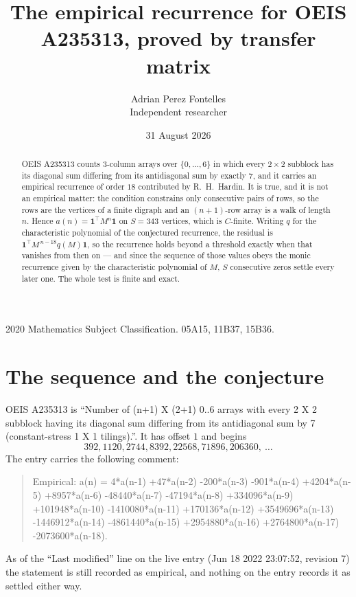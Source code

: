 \documentclass[11pt,a4paper]{article}
\title{The empirical recurrence for OEIS A235313, proved by transfer matrix}
\author{Adrian Perez Fontelles\\ \small Independent researcher}
\date{31 August 2026}
\theoremstyle{plain}
\theoremstyle{definition}
\begin{document}
\maketitle

\begin{abstract}
OEIS A235313 counts $3$-column arrays over $\{0,\dots,6\}$ in which every
$2\times2$ subblock has its diagonal sum differing from its antidiagonal sum by
exactly $7$, and it
carries an empirical recurrence of order $18$ contributed by R.~H.~Hardin. It is true,
and it is not an empirical matter: the condition constrains only consecutive pairs of rows,
so the rows are the vertices of a finite digraph and an $(n+1)$-row array is a walk of
length $n$. Hence $a(n)=\mathbf{1}^{\!\top}M^{n}\mathbf{1}$ on $S=343$ vertices, which
is $C$-finite. Writing $q$ for the characteristic polynomial of the conjectured recurrence,
the residual is $\mathbf{1}^{\!\top}M^{\,n-18}q(M)\mathbf{1}$, so the recurrence
holds beyond a threshold exactly when that vanishes from then on --- and since the sequence
of those values obeys the monic recurrence given by the characteristic polynomial of $M$,
$S$ consecutive zeros settle every later one. The whole test is finite and exact.
\end{abstract}

\noindent\small 2020 Mathematics Subject Classification. 05A15, 11B37, 15B36.\normalsize

\section{The sequence and the conjecture}

OEIS A235313 is ``Number of (n+1) X (2+1) 0..6 arrays with every 2 X 2 subblock having its diagonal sum differing from its antidiagonal sum by 7 (constant-stress 1 X 1 tilings).''. It has offset
$1$ and begins
\[
392, 1120, 2744, 8392, 22568, 71896, 206360,\ \dots
\]
The entry carries the following comment:
\begin{quote}\small
Empirical: a(n) = 4*a(n-1) +47*a(n-2) -200*a(n-3) -901*a(n-4) +4204*a(n-5) +8957*a(n-6) -48440*a(n-7) -47194*a(n-8) +334096*a(n-9) +101948*a(n-10) -1410080*a(n-11) +170136*a(n-12) +3549696*a(n-13) -1446912*a(n-14) -4861440*a(n-15) +2954880*a(n-16) +2764800*a(n-17) -2073600*a(n-18).
\end{quote}
As of the ``Last modified'' line on the live entry (Jun 18 2022 23:07:52, revision 7) the statement is
still recorded as empirical, and nothing on the entry records it as settled either way.
\end{document}
